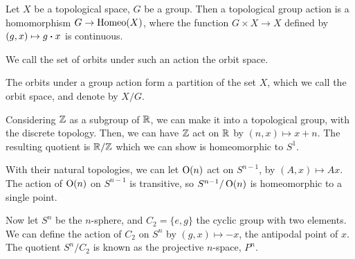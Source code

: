 \documentclass{article}
\begin{document}
    \begin{definition}

        Let $X$ be a topological space, $G$ be a group. Then a topological group action is a homomorphism $G \to \operatorname{Homeo}(X)$, where the function $G \times X \to X$ defined by $(g, x) \mapsto g \vdot x$ is continuous.
    \end{definition}

    We call the set of orbits under such an action the orbit space.

    \begin{definition}

        The orbits under a group action form a partition of the set $X$, which we call the orbit space, and denote by $X/G$.
    \end{definition}

    \begin{example}
        [Circle]

        Considering $\mathbb{Z}$ as a subgroup of $\mathbb{R}$, we can make it into a topological group, with the discrete topology. Then, we can have $\mathbb{Z}$ act on $\mathbb{R}$ by $(n, x) \mapsto x + n$. The resulting quotient is $\mathbb{R}/\mathbb{Z}$ which we can show is homeomorphic to $S^1$.
    \end{example}

    \begin{example}

        With their natural topologies, we can let $\operatorname{O}(n)$ act on $S^{n-1}$, by $(A, x) \mapsto Ax$. The action of $\operatorname{O}(n)$ on $S^{n-1}$ is transitive, so $S^{n-1}/\operatorname{O}(n)$ is homeomorphic to a single point.
    \end{example}

    \begin{example}

        Now let $S^n$ be the $n$-sphere, and $C_2 = \{e, g\}$ the cyclic group with two elements. We can define the action of $C_2$ on $S^n$ by $(g, x) \mapsto -x$, the antipodal point of $x$. The quotient $S^n/C_2$ is known as the projective $n$-space, $P^n$.
    \end{example}
\end{document}
